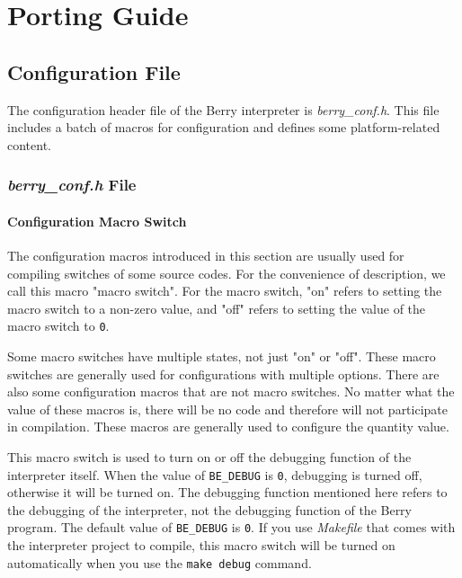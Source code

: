 \chapter {Porting Guide}

\section {Configuration File}

The configuration header file of the Berry interpreter is \textsl{berry\_conf.h}. This file includes a batch of macros for configuration and defines some platform-related content.

\subsection{\textsl{berry\_conf.h} File}

\subsubsection{Configuration Macro Switch}

The configuration macros introduced in this section are usually used for compiling switches of some source codes. For the convenience of description, we call this macro "macro switch". For the macro switch, "on" refers to setting the macro switch to a non-zero value, and "off" refers to setting the value of the macro switch to \texttt{0}.

Some macro switches have multiple states, not just "on" or "off". These macro switches are generally used for configurations with multiple options. There are also some configuration macros that are not macro switches. No matter what the value of these macros is, there will be no code and therefore will not participate in compilation. These macros are generally used to configure the quantity value.

 \label{section::BE_DEBUG}

This macro switch is used to turn on or off the debugging function of the interpreter itself. When the value of \texttt{BE\_DEBUG} is \texttt{0}, debugging is turned off, otherwise it will be turned on. The debugging function mentioned here refers to the debugging of the interpreter, not the debugging function of the Berry program. The default value of \texttt{BE\_DEBUG} is \texttt{0}. If you use \textsl{Makefile} that comes with the interpreter project to compile, this macro switch will be turned on automatically when you use the \texttt{make debug} command.

